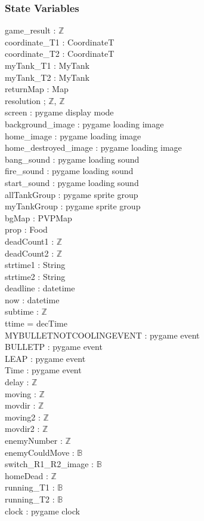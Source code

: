 \documentclass[12pt, titlepage]{article}
\begin{document}
		\subsubsection{State Variables}
		game\_result : $\mathbb{Z}$\\
		coordinate\_T1 : CoordinateT\\
		coordinate\_T2 : CoordinateT\\
		myTank\_T1 : MyTank\\
		myTank\_T2 : MyTank\\
		returnMap : Map\\
		resolution ; $\mathbb{Z}$, $\mathbb{Z}$\\
		screen : pygame display mode\\
		background\_image : pygame loading image\\
        home\_image : pygame loading image\\
        home\_destroyed\_image : pygame loading image\\
        bang\_sound : pygame loading sound\\
        fire\_sound : pygame loading sound\\
        start\_sound : pygame loading sound\\
        allTankGroup : pygame sprite group\\
        myTankGroup : pygame sprite group\\
        bgMap : PVPMap\\
        prop : Food\\
        deadCount1 : $\mathbb{Z}$\\
        deadCount2 : $\mathbb{Z}$\\
        strtime1 : String\\
        strtime2 : String\\
        deadline : datetime\\
        now : datetime\\
        subtime : $\mathbb{Z}$\\
        ttime = decTime\\
        MYBULLETNOTCOOLINGEVENT : pygame event\\
        BULLETP : pygame event\\
        LEAP : pygame event\\
        Time : pygame event\\
        delay : $\mathbb{Z}$\\
		moving : $\mathbb{Z}$\\
		movdir : $\mathbb{Z}$\\
		moving2 : $\mathbb{Z}$\\
		movdir2 : $\mathbb{Z}$\\
		enemyNumber : $\mathbb{Z}$\\
		enemyCouldMove : $\mathbb{B}$\\
		switch\_R1\_R2\_image : $\mathbb{B}$\\
		homeDead : $\mathbb{Z}$\\
		running\_T1 : $\mathbb{B}$\\
		running\_T2 : $\mathbb{B}$\\
		clock : pygame clock
\end{document}
